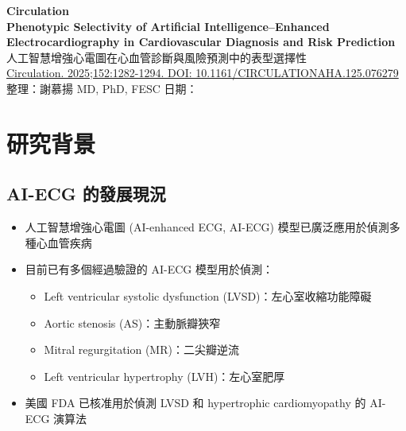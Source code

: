\documentclass[12pt,a4paper]{article}
\begin{document}
\begin{center}
{\LARGE\bfseries\textcolor{emergency_red}{Circulation}}\\[0.5cm]
{\Large\textbf{Phenotypic Selectivity of Artificial Intelligence–Enhanced Electrocardiography in Cardiovascular Diagnosis and Risk Prediction}}\\[0.3cm]
{\large 人工智慧增強心電圖在心血管診斷與風險預測中的表型選擇性}\\[0.5cm]
{\normalsize \href{https://doi.org/10.1161/CIRCULATIONAHA.125.076279}{Circulation. 2025;152:1282-1294. DOI: 10.1161/CIRCULATIONAHA.125.076279}}\\[0.3cm]
{\normalsize 整理：謝慕揚 MD, PhD, FESC \quad 日期：\mydate}
\end{center}

\vspace{0.5cm}

\section{研究背景}

\subsection{AI-ECG 的發展現況}

\begin{itemize}
    \item 人工智慧增強心電圖 (AI-enhanced ECG, AI-ECG) 模型已廣泛應用於偵測多種心血管疾病
    \item 目前已有多個經過驗證的 AI-ECG 模型用於偵測：
    \begin{itemize}
        \item Left ventricular systolic dysfunction (LVSD)：左心室收縮功能障礙
        \item Aortic stenosis (AS)：主動脈瓣狹窄
        \item Mitral regurgitation (MR)：二尖瓣逆流
        \item Left ventricular hypertrophy (LVH)：左心室肥厚
    \end{itemize}
    \item 美國 FDA 已核准用於偵測 LVSD 和 hypertrophic cardiomyopathy 的 AI-ECG 演算法
\end{itemize}
\end{document}

